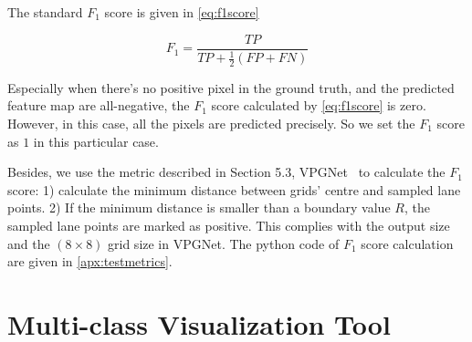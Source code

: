 \begin{spacing}{1.5}
The standard $F_1$ score is given in \autoref{eq:f1score}

\begin{equation}
\label{eq:f1score}
    F_1=\frac{TP}{TP+\frac{1}{2}(FP+FN)}
\end{equation}

Especially when there's no positive pixel in the ground truth, and the predicted feature map are all-negative, the $F_1$ score calculated by \autoref{eq:f1score} is zero. However, in this case, all the pixels are predicted precisely. So we set the $F_1$ score as $1$ in this particular case.

Besides, we use the metric described in Section 5.3, VPGNet~\cite{lee2017vpgnet} to calculate the $F_1$ score: 1) calculate the minimum distance between grids' centre and sampled lane points. 2) If the minimum distance is smaller than a boundary value $R$, the sampled lane points are marked as positive. This complies with the output size and the $(8 \times 8)$ grid size in VPGNet. The python code of $F_1$ score calculation are given in \autoref{apx:testmetrics}.

\section{Multi-class Visualization Tool}
\label{sec:EX_multivisual}


\end{spacing}
